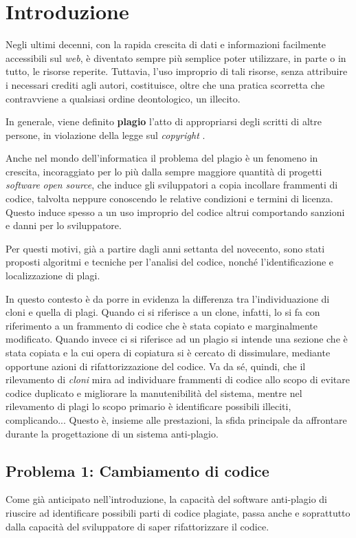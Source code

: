 \chapter{Introduzione}
Negli ultimi decenni, con la rapida crescita di dati e informazioni facilmente accessibili sul \textit{web}, è diventato sempre più semplice poter utilizzare, in parte o in tutto, le risorse reperite.
%
Tuttavia, l'uso improprio di tali risorse, senza attribuire i necessari crediti agli autori, costituisce, oltre che una pratica scorretta che contravviene a qualsiasi ordine deontologico, un illecito. 

In generale, viene definito \textbf{plagio} l'atto di appropriarsi degli scritti di altre persone, in violazione della legge sul \textit{copyright} \cite{britannica}.

Anche nel mondo dell'informatica il problema del plagio è un fenomeno in crescita, incoraggiato per lo più dalla sempre maggiore quantità di progetti \textit{software} \textit{open source}, che induce gli sviluppatori a copia incollare frammenti di codice, talvolta neppure conoscendo le relative condizioni e termini di licenza.
%
Questo induce spesso a un uso improprio del codice altrui comportando sanzioni e danni per lo sviluppatore.

Per questi motivi, già a partire dagli anni settanta del novecento, sono stati proposti algoritmi e tecniche per l'analisi del codice, nonché l'identificazione e localizzazione di plagi.

In questo contesto è da porre in evidenza la differenza tra l'individuazione di cloni e quella di plagi.
%
Quando ci si riferisce a un clone, infatti, lo si fa con riferimento a un frammento di codice che è stata copiato e marginalmente modificato. 
%
Quando invece ci si riferisce ad un plagio si intende una sezione che è stata copiata e la cui opera di copiatura si è cercato di dissimulare, mediante opportune azioni di rifattorizzazione del codice.  
%
Va da sé, quindi, che il rilevamento di \textit{cloni} mira ad individuare frammenti di codice allo scopo di evitare codice duplicato e migliorare la manutenibilità del sistema, mentre nel rilevamento di plagi lo scopo primario è identificare possibili illeciti, complicando...
%
Questo è, insieme alle prestazioni, la sfida principale da affrontare durante la progettazione di un sistema anti-plagio.

\section{Problema 1: Cambiamento di codice}
Come già anticipato nell'introduzione, la capacità del software anti-plagio di riuscire ad identificare possibili parti di codice plagiate, passa anche e soprattutto dalla capacità del sviluppatore di saper rifattorizzare il codice.

